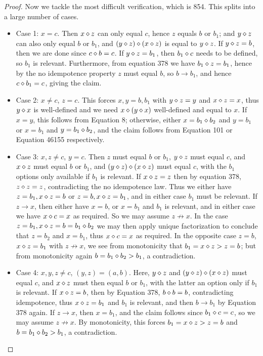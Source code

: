 \begin{proof}
Now we tackle the most difficult verification, which is 854.  This splits into a large number of cases.
\begin{itemize}
  \item Case 1: $x=c$.  Then $x \diamond z$ can only equal $c$, hence $z$ equals $b$ or $b_1$; and $y \diamond z$ can also only equal $b$ or $b_1$, and $(y \diamond z) \diamond (x \diamond z)$ is equal to $y \diamond z$.  If $y \diamond z = b$, then we are done since $c \diamond b = c$.  If $y \diamond z = b_1$, then $b_1 \diamond c$ needs to be defined, so $b_1$ is relevant.  Furthermore, from equation 378 we have $b_1 \diamond z = b_1$, hence by the no idempotence property $z$ must equal $b$, so $b \to b_1$, and hence $c \diamond b_1 = c$, giving the claim.
  \item Case 2: $x \neq c$, $z = c$.  This forces $x,y=b,b_1$ with $y \diamond z = y$ and $x \diamond z = x$, thus $y \diamond x$ is well-defined and we need $x \diamond (y \diamond x)$ well-defined and equal to $x$.  If $x=y$, this follows from Equation 8; otherwise, either $x = b_1 \diamond b_2$ and $y = b_1$ or $x = b_1$ and $y = b_1 \diamond b_2$, and the claim follows from Equation 101 or Equation 46155 respectively.
  \item Case 3: $x, z \neq c$, $y = c$.  Then $z$ must equal $b$ or $b_1$, $y \diamond z$ must equal $c$, and $x \diamond z$ must equal $b$ or $b_1$, and $(y \diamond z) \diamond (x \diamond z)$ must equal $c$, with the $b_1$ options only available if $b_1$ is relevant.  If $x \diamond z = z$ then by equation 378, $z \diamond z = z$, contradicting the no idempotence law.  Thus we either have $z=b_1, x \diamond z = b$ or $z = b, x \diamond z = b_1$, and in either case $b_1$ must be relevant.  If $z \to x$, then either have $x=b$, or $x = b_1$ and $b_1$ is relevant, and in either case we have $x \diamond c = x$ as required.  So we may assume $z \not \to x$.  In the case $z = b_1, x \diamond z = b = b_1 \diamond b_2$ we may then apply unique factorization to conclude that $z = b_2$ and $x = b_1$, thus $x \diamond c = x$ as required.  In the opposite case $z = b$, $x \diamond z = b_1$ with $z \not \to x$, we see from monotonicity that $b_1 = x \diamond z > z = b$; but from monotonicity again $b = b_1 \diamond b_2 > b_1$, a contradiction.
  \item Case 4: $x,y,z \neq c$, $(y,z) = (a,b)$.  Here, $y \diamond z$ and $(y \diamond z) \diamond (x \diamond z)$ must equal $c$, and $x \diamond z$ must then equal $b$ or $b_1$, with the latter an option only if $b_1$ is relevant.  If $x \diamond z = b$, then by Equation 378, $b \diamond b = b$, contradicting idempotence, thus $x \diamond z = b_1$ and $b_1$ is relevant, and then $b \to b_1$ by Equation 378 again.  If $z \to x$, then $x = b_1$, and the claim follows since $b_1 \diamond c = c$, so we may assume $z \not \to x$.  By monotonicity, this forces $b_1 = x \diamond z > z = b$ and $b = b_1 \diamond b_2 > b_1$, a contradiction.

\end{itemize}
\end{proof}
